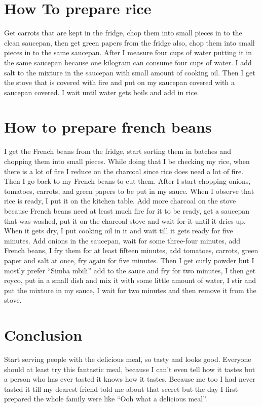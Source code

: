 \documentclass[14pt]{article}
\begin{document}
\section{How To prepare rice}

Get carrots that are kept in the fridge, chop them into small pieces in to the clean saucepan, then get green papers from the fridge also, chop them into small pieces in to the same saucepan. After I measure four cups of water putting it in the same saucepan because one kilogram can consume four cups of water. I add salt to the mixture in the saucepan with small amount of cooking oil. Then I get the stove that is covered with fire and put on my saucepan covered with a saucepan covered. I wait until water gets boils and add in rice.

\section{How to prepare french beans}

I get the French beans from the fridge, start sorting them in batches and chopping them into small pieces. While doing that I be checking my rice, when there is a lot of fire I reduce on the charcoal since rice does need a lot of fire. Then I go back to my French beans to cut them. After I start chopping onions, tomatoes, carrots, and green papers to be put in my sauce.
When I observe that rice is ready, I put it on the kitchen table. Add more charcoal on the stove because French beans need at least much fire for it to be ready, get a saucepan that was washed, put it on the charcoal stove and wait for it until it dries up.
When it gets dry, I put cooking oil in it and wait till it gets ready for five minutes. Add onions in the saucepan, wait for some three-four minutes, add French beans, I fry them for at least fifteen minutes, add tomatoes, carrots, green paper and salt at once, fry again for  five minutes. Then I get curly powder but I mostly prefer “Simba mbili” add to the sauce and fry for two minutes, I then get royco, put in a small dish and mix it with some little amount of water, I stir and put the mixture in my sauce, I wait for two minutes and then remove it from the stove.

\section{Conclusion}
Start serving people with the delicious meal, so tasty and looks good.
Everyone should at least try this fantastic meal, because I can’t even tell how it tastes but a person who has ever tasted it knows how it tastes. Because me too I had never tasted it till my dearest friend told me about that secret but the day I first prepared the whole family were like “Ooh what a delicious meal”. 
\end{document}
